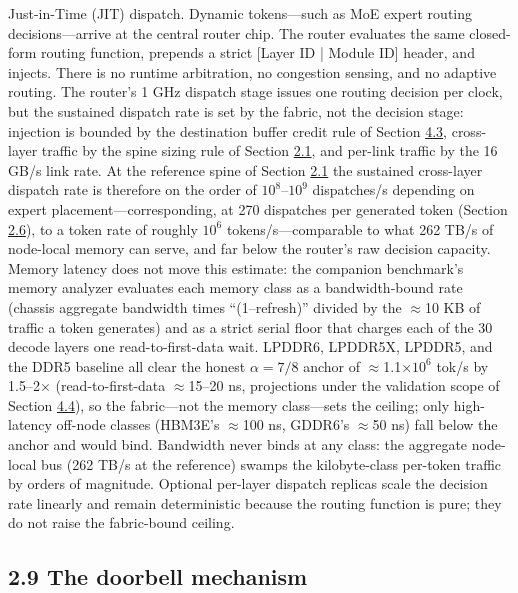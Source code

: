 \documentclass[12pt,onecolumn]{article}
\begin{document}
Just-in-Time (JIT) dispatch. Dynamic tokens---such as MoE expert routing decisions---arrive at the central router chip. The router evaluates the same closed-form routing function, prepends a strict [Layer ID | Module ID] header, and injects. There is no runtime arbitration, no congestion sensing, and no adaptive routing. The router's 1 GHz dispatch stage issues one routing decision per clock, but the sustained dispatch rate is set by the fabric, not the decision stage: injection is bounded by the destination buffer credit rule of Section \hyperref[sec:4.3]{4.3}, cross-layer traffic by the spine sizing rule of Section \hyperref[sec:2.1]{2.1}, and per-link traffic by the 16 GB/s link rate. At the reference spine of Section \hyperref[sec:2.1]{2.1} the sustained cross-layer dispatch rate is therefore on the order of $10^{8}$--$10^{9}$ dispatches/s depending on expert placement---corresponding, at 270 dispatches per generated token (Section \hyperref[sec:2.6]{2.6}), to a token rate of roughly $10^{6}$ tokens/s---comparable to what 262 TB/s of node-local memory can serve, and far below the router's raw decision capacity. Memory latency does not move this estimate: the companion benchmark's memory analyzer evaluates each memory class as a bandwidth-bound rate (chassis aggregate bandwidth times ``(1--refresh)'' divided by the $\approx$10 KB of traffic a token generates) and as a strict serial floor that charges each of the 30 decode layers one read-to-first-data wait. LPDDR6, LPDDR5X, LPDDR5, and the DDR5 baseline all clear the honest $\alpha=7/8$ anchor of $\approx$1.1$\times10^{6}$ tok/s by 1.5--2$\times$ (read-to-first-data $\approx$15--20 ns, projections under the validation scope of Section \hyperref[sec:4.4]{4.4}), so the fabric---not the memory class---sets the ceiling; only high-latency off-node classes (HBM3E's $\approx$100 ns, GDDR6's $\approx$50 ns) fall below the anchor and would bind. Bandwidth never binds at any class: the aggregate node-local bus (262 TB/s at the reference) swamps the kilobyte-class per-token traffic by orders of magnitude. Optional per-layer dispatch replicas scale the decision rate linearly and remain deterministic because the routing function is pure; they do not raise the fabric-bound ceiling.

\subsection*{2.9 The doorbell mechanism}\label{sec:2.9}
\end{document}
